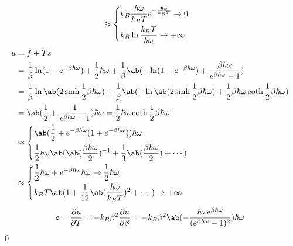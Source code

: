 \documentclass[uplatex,diffipdfmx,a4paper,11pt]{jlreq}
\makeatletter
\theoremstyle{definition}
\renewenvironment{proof}[1][\proofname]{\par
  \normalfont
  \topsep6\p@\@plus6\p@ \trivlist
  \item[\hskip\labelsep{\bfseries #1}\@addpunct{\bfseries}]\ignorespaces\quad\par
}{%
  \qed\endtrivlist\@endpefalse
}
\renewcommand\proofname{証明}
\makeatother
\begin{document}
\begin{proof}
\begin{align}
      & \approx \begin{dcases}
                  k_B\frac{\hbar\omega}{k_BT}e^{- \frac{\hbar\omega}{k_BT}} \to 0 \\
                  k_B\ln\frac{k_BT}{\hbar\omega} \to +\infty                      \\
                \end{dcases}
  \end{align}
  \begin{align}
    u & = f + Ts                                                                                                                                                                                   \\
      & = \frac{1}{\beta}\ln(1 - e^{-\beta\hbar\omega}) + \frac{1}{2}\hbar\omega + \frac{1}{\beta}\ab(-\ln(1 - e^{-\beta\hbar\omega}) + \frac{\beta\hbar\omega}{e^{\beta\hbar\omega} - 1})         \\
      & = \frac{1}{\beta}\ln\ab(2\sinh \frac{1}{2}\beta\hbar\omega) + \frac{1}{\beta}\ab(-\ln\ab(2\sinh\frac{1}{2}\beta\hbar\omega) + \frac{1}{2}\beta\hbar\omega\coth\frac{1}{2}\beta\hbar\omega) \\
      & = \ab(\frac{1}{2} + \frac{1}{e^{\beta\hbar\omega} - 1})\hbar\omega = \frac{1}{2}\hbar\omega\coth\frac{1}{2}\beta\hbar\omega                                                                \\
      & \approx \begin{dcases}
                  \ab(\frac{1}{2} + e^{-\beta\hbar\omega}(1 + e^{-\beta\hbar\omega}))\hbar\omega                                        \\
                  \frac{1}{2}\hbar\omega\ab(\ab(\frac{\beta\hbar\omega}{2})^{-1} + \frac{1}{3}\ab(\frac{\beta\hbar\omega}{2}) + \cdots) \\
                \end{dcases}                                                              \\
      & \approx \begin{dcases}
                  \frac{1}{2}\hbar\omega + e^{-\beta\hbar\omega}\hbar\omega \to \frac{1}{2}\hbar\omega \\
                  k_BT\ab(1 + \frac{1}{12}\ab(\frac{\hbar\omega}{k_BT})^{2} + \cdots) \to +\infty      \\
                \end{dcases}
  \end{align}
  \begin{align}
    c & = \diffp{u}{T} = -k_B\beta^2\diffp{u}{\beta} = -k_B\beta^2\ab(-\frac{\hbar\omega e^{\beta\hbar\omega}}{(e^{\beta\hbar\omega} - 1)^2})\hbar\omega                              \\

\end{align}
\end{proof}
\end{document}
